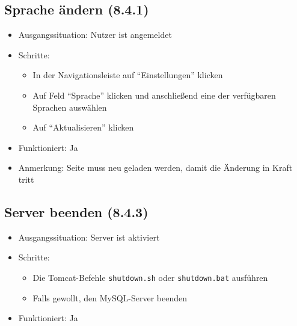 \documentclass[a4paper]{scrreprt}
\begin{document}
            \subsection{Sprache ändern (8.4.1)}
            \begin{itemize}
                \item Ausgangssituation: Nutzer ist angemeldet
                \item Schritte:
                    \begin{itemize}
                        \item In der Navigationsleiste auf \enquote{Einstellungen} klicken
                        \item Auf Feld \enquote{Sprache} klicken und anschließend eine der verfügbaren Sprachen auswählen
                        \item Auf \enquote{Aktualisieren} klicken
                    \end{itemize}
                \item Funktioniert: Ja
                \item Anmerkung: Seite muss neu geladen werden, damit die Änderung in Kraft tritt
            \end{itemize}

            \subsection{Server beenden (8.4.3)}
            \begin{itemize}
                \item Ausgangssituation: Server ist aktiviert
                \item Schritte:
                    \begin{itemize}
                        \item Die Tomcat-Befehle \texttt{shutdown.sh} oder \texttt{shutdown.bat} ausführen
                        \item Falls gewollt, den MySQL-Server beenden
                    \end{itemize}
                \item Funktioniert: Ja
            \end{itemize}
\end{document}
